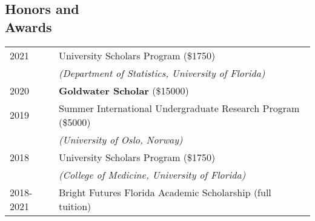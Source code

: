 \documentclass[margin,centered]{res}
\newenvironment{list1}{
  \begin{list}{\ding{113}}{%
      \setlength{\itemsep}{0in}
      \setlength{\parsep}{0in} \setlength{\parskip}{0in}
      \setlength{\topsep}{0in} \setlength{\partopsep}{0in}
      \setlength{\leftmargin}{0.17in}}}{\end{list}}
\newenvironment{list2}{
  \begin{list}{$\bullet$}{%
      \setlength{\itemsep}{0in}
      \setlength{\parsep}{0in} \setlength{\parskip}{0in}
      \setlength{\topsep}{0in} \setlength{\partopsep}{0in}
      \setlength{\leftmargin}{0.2in}}}{\end{list}}
\begin{document}
\begin{resume}









\section{\sc Honors and\\ Awards}

\begin{tabular}{@{}p{0.8in}p{4in}}
2021 & University Scholars Program (\$1750)\\
&\textit{(Department of Statistics, University of Florida)}\\
2020 & \textbf{Goldwater Scholar} (\$15000)\\
2019 & Summer International Undergraduate Research Program (\$5000) \\
&\textit{(University of Oslo, Norway)}\\
2018 & University Scholars Program (\$1750)\\
&\textit{(College of Medicine, University of Florida)}\\
2018-2021 & Bright Futures Florida Academic Scholarship (full tuition) \\
\end{tabular}


\end{resume}
\end{document}

